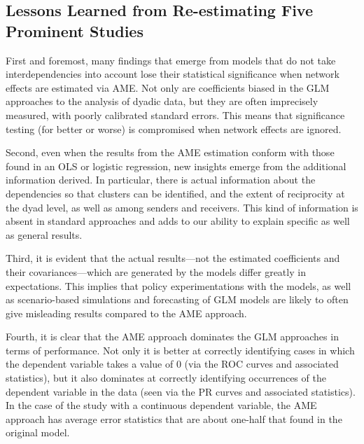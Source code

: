 \subsection{Lessons Learned from Re-estimating Five Prominent Studies}

First and foremost, many findings that emerge from models that do not take interdependencies into account lose their statistical significance when network effects are estimated via AME. Not only are coefficients biased in the GLM approaches to the analysis of dyadic data, but they are often imprecisely measured, with poorly calibrated standard errors.  This means that significance testing (for better or worse) is compromised when network effects are ignored.

Second, even when the results from the AME estimation conform with those found in an OLS or logistic regression, new insights emerge from the additional information derived. In particular, there is actual information about the dependencies so that clusters can be identified, and the extent of reciprocity at the dyad level, as well as among senders and receivers.  This kind of information is absent in standard approaches and adds to our ability to explain specific as well as general results.

Third, it is evident that the actual results---not the estimated coefficients and their covariances---which are generated by the models differ greatly in expectations.  This implies that policy experimentations with the models, as well as scenario-based simulations and forecasting of GLM models are likely to often give misleading results compared to the AME approach.

Fourth, it is clear that the AME approach dominates the GLM approaches in terms of performance. Not only it is better at correctly identifying cases in which the dependent variable takes a value of $0$ (via the ROC curves and associated statistics), but it also dominates at correctly identifying occurrences of the dependent variable in the data (seen via the PR curves and associated statistics). In the case of the study with a continuous dependent variable, the AME approach has average error statistics that are about one-half that found in the original model. 